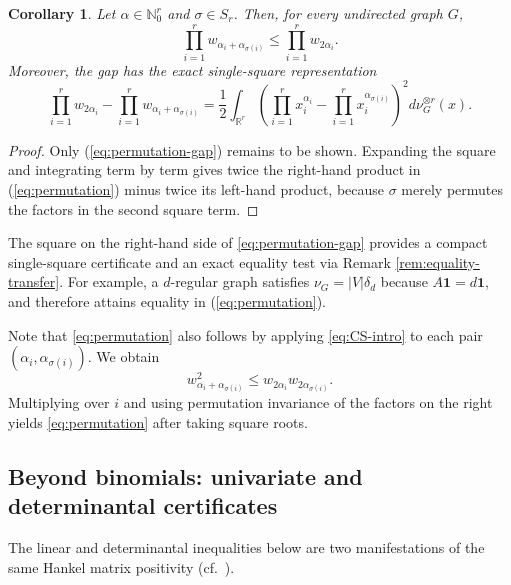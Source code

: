 \documentclass[11pt]{article}
\newtheorem{corollary}[definition]{Corollary}
\newcommand{\Nat}{\mathbb{N}}
\newcommand{\Real}{\mathbb{R}}
\newcommand{\one}{\mathbf{1}}
\theoremstyle{remark}
\begin{document}
\begin{corollary}\label{cor:permutation}
Let $\alpha\in\Nat_0^r$ and $\sigma\in S_r$. Then, for every undirected graph $G$,
\begin{equation}\label{eq:permutation}
  \prod_{i=1}^r w_{\alpha_i+\alpha_{\sigma(i)}}
  \leq \prod_{i=1}^r w_{2\alpha_i}.
\end{equation}
Moreover, the gap has the exact single-square representation
\begin{equation}\label{eq:permutation-gap}
  \prod_{i=1}^r w_{2\alpha_i}
  -\prod_{i=1}^r w_{\alpha_i+\alpha_{\sigma(i)}}
  =\frac12\int_{\Real^r}
    \left(
      \prod_{i=1}^r x_i^{\alpha_i}
      -\prod_{i=1}^r x_i^{\alpha_{\sigma(i)}}
    \right)^2
    d\nu_G^{\otimes r}(x).
\end{equation}
\end{corollary}

\begin{proof}
Only (\ref{eq:permutation-gap}) remains to be shown.  Expanding the square and integrating term by term gives twice the right-hand product in (\ref{eq:permutation}) minus twice its left-hand product, because $\sigma$ merely permutes the factors in the second square term.
\end{proof}

The square on the right-hand side of \eqref{eq:permutation-gap} provides a compact single-square certificate and an exact equality test via Remark \ref{rem:equality-transfer}.
For example, a $d$-regular graph satisfies $\nu_G=|V|\delta_d$ because $A\one=d\one$, and therefore attains equality in (\ref{eq:permutation}).

Note that \eqref{eq:permutation} also follows by applying \eqref{eq:CS-intro} to each pair $(\alpha_i,\alpha_{\sigma(i)})$. We obtain
\[
  w_{\alpha_i+\alpha_{\sigma(i)}}^2
  \leq w_{2\alpha_i}w_{2\alpha_{\sigma(i)}}.
\]
Multiplying over $i$ and using permutation invariance of the
factors on the right yields \eqref{eq:permutation} after taking square roots.


\subsection{Beyond binomials: univariate and determinantal certificates}

The linear and determinantal inequalities below are two manifestations of the same Hankel matrix positivity (cf.~\cite{barreras-et-al-2021}). 
\end{document}
